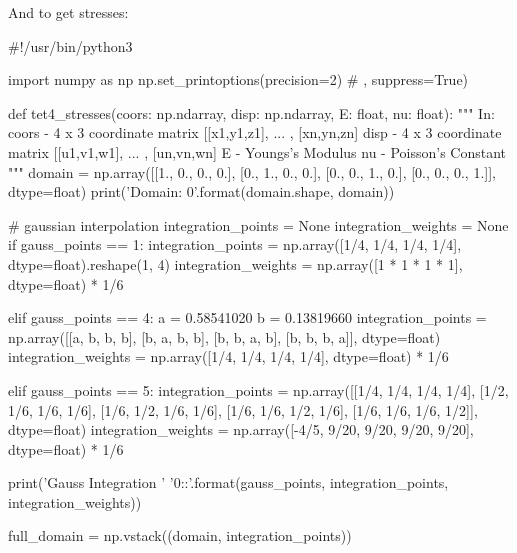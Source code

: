 \documentclass[10pt,b5paper,titlepage]{book}
\begin{document}
And to get stresses:
\begin{python}
#!/usr/bin/python3

import numpy as np
np.set_printoptions(precision=2) # , suppress=True)

def tet4_stresses(coors: np.ndarray,
                  disp: np.ndarray,
                  E: float,
                  nu: float):
    """
    In:
        coors - 4 x 3 coordinate matrix
                [[x1,y1,z1], ... , [xn,yn,zn]
        disp  - 4 x 3 coordinate matrix
                [[u1,v1,w1], ... , [un,vn,wn]
        E     - Youngs's Modulus
        nu    - Poisson's Constant
    """
    domain = np.array([[1., 0., 0., 0.],
                       [0., 1., 0., 0.],
                       [0., 0., 1., 0.],
                       [0., 0., 0., 1.]], dtype=float)
    print('Domain: {0}'.format(domain.shape, domain))

    # gaussian interpolation
    integration_points = None
    integration_weights = None
    if gauss_points == 1:
        integration_points = np.array([1/4, 1/4, 1/4, 1/4],
                                      dtype=float).reshape(1, 4)
        integration_weights = np.array([1 * 1 * 1 * 1],
                                       dtype=float) * 1/6

    elif gauss_points == 4:
        a = 0.58541020
        b = 0.13819660
        integration_points = np.array([[a, b, b, b],
                                       [b, a, b, b],
                                       [b, b, a, b],
                                       [b, b, b, a]], dtype=float)
        integration_weights = np.array([1/4, 1/4, 1/4, 1/4],
                                       dtype=float) * 1/6

    elif gauss_points == 5:
        integration_points = np.array([[1/4, 1/4, 1/4, 1/4],
                                       [1/2, 1/6, 1/6, 1/6],
                                       [1/6, 1/2, 1/6, 1/6],
                                       [1/6, 1/6, 1/2, 1/6],
                                       [1/6, 1/6, 1/6, 1/2]], dtype=float)
        integration_weights = np.array([-4/5, 9/20, 9/20, 9/20, 9/20],
                                       dtype=float) * 1/6

    print('Gauss Integration '
          '{0}:\nWeights:'.format(gauss_points,
                                            integration_points,
                                            integration_weights))

    full_domain = np.vstack((domain, integration_points))


\end{python}
\end{document}

